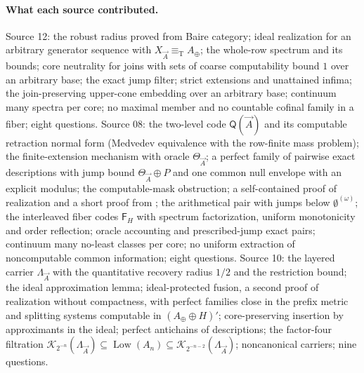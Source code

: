 \documentclass[11pt,letterpaper]{article}
\theoremstyle{plain}
\theoremstyle{definition}
\theoremstyle{remark}
\numberwithin{equation}{section}
\newcommand{\eqT}{\equiv_{\mathrm T}}
\newcommand{\Low}{\operatorname{Low}}
\newcommand{\Aplus}{A_{\oplus}}          %
\newcommand{\QQ}{\mathsf Q}              %
\newcommand{\Fint}{\mathsf F}            %
\newcommand{\Lam}{\Lambda_{\vec A}}      %
\begin{document}
\paragraph{What each source contributed.} Source 12: the robust radius proved from
Baire category; ideal realization for an arbitrary generator sequence with
$X_{\vec A}\eqT\Aplus$; the whole-row spectrum and its bounds; core neutrality for
joins with sets of coarse computability bound $1$ over an arbitrary base; the exact
jump filter; strict extensions and unattained infima; the join-preserving upper-cone
embedding over an arbitrary base; continuum many spectra per core; no maximal member
and no countable cofinal family in a fiber; eight questions. Source 08: the two-level
code $\QQ(\vec A)$ and its computable retraction normal form (Medvedev equivalence with
the row-finite mass problem); the finite-extension mechanism with oracle
$\Theta_{\vec A}$; a perfect family of pairwise exact descriptions with jump bound
$\Theta_{\vec A}\oplus P$ and one common null envelope with an explicit modulus; the
computable-mask obstruction; a self-contained proof of realization and a short proof
from \cite[Theorem~3.7]{HJKS}; the arithmetical pair with jumps below
$\emptyset^{(\omega)}$; the interleaved fiber codes $\Fint_H$ with spectrum
factorization, uniform monotonicity and order reflection; oracle accounting and
prescribed-jump exact pairs; continuum many no-least classes per core; no uniform
extraction of noncomputable common information; eight questions. Source 10: the
layered carrier $\Lam$ with the quantitative recovery radius $1/2$ and the
restriction bound; the ideal approximation lemma; ideal-protected fusion, a second
proof of realization without compactness, with perfect families close in the prefix
metric and splitting systems computable in $(\Aplus\oplus H)'$; core-preserving
insertion by approximants in the ideal; perfect antichains of descriptions; the
factor-four filtration $\mathcal K_{2^{-n}}(\Lam)\subseteq\Low(A_n)\subseteq
\mathcal K_{2^{-n-2}}(\Lam)$; noncanonical carriers; nine questions.
\end{document}

